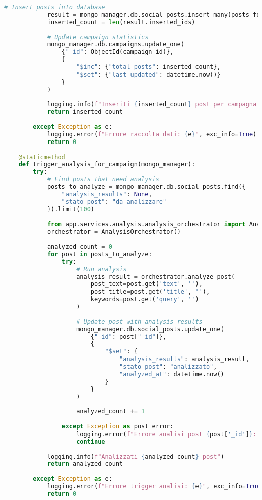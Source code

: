 \documentclass[12pt,a4paper]{report}
\begin{document}
\begin{lstlisting}[language=Python, caption=Data Collection Service]
            # Insert posts into database
            result = mongo_manager.db.social_posts.insert_many(posts_for_insertion)
            inserted_count = len(result.inserted_ids)
            
            # Update campaign statistics
            mongo_manager.db.campaigns.update_one(
                {"_id": ObjectId(campaign_id)},
                {
                    "$inc": {"total_posts": inserted_count},
                    "$set": {"last_updated": datetime.now()}
                }
            )
            
            logging.info(f"Inseriti {inserted_count} post per campagna {campaign_id}")
            return inserted_count
            
        except Exception as e:
            logging.error(f"Errore raccolta dati: {e}", exc_info=True)
            return 0
    
    @staticmethod
    def trigger_analysis_for_campaign(mongo_manager):
        try:
            # Find posts that need analysis
            posts_to_analyze = mongo_manager.db.social_posts.find({
                "analysis_results": None,
                "stato_post": "da analizzare"
            }).limit(100)
            
            from app.services.analysis.analysis_orchestrator import AnalysisOrchestrator
            orchestrator = AnalysisOrchestrator()
            
            analyzed_count = 0
            for post in posts_to_analyze:
                try:
                    # Run analysis
                    analysis_result = orchestrator.analyze_post(
                        post_text=post.get('text', ''),
                        post_title=post.get('title', ''),
                        keywords=post.get('query', '')
                    )
                    
                    # Update post with analysis results
                    mongo_manager.db.social_posts.update_one(
                        {"_id": post["_id"]},
                        {
                            "$set": {
                                "analysis_results": analysis_result,
                                "stato_post": "analizzato",
                                "analyzed_at": datetime.now()
                            }
                        }
                    )
                    
                    analyzed_count += 1
                    
                except Exception as post_error:
                    logging.error(f"Errore analisi post {post['_id']}: {post_error}")
                    continue
            
            logging.info(f"Analizzati {analyzed_count} post")
            return analyzed_count
            
        except Exception as e:
            logging.error(f"Errore trigger analisi: {e}", exc_info=True)
            return 0
\end{lstlisting}
\end{document}
